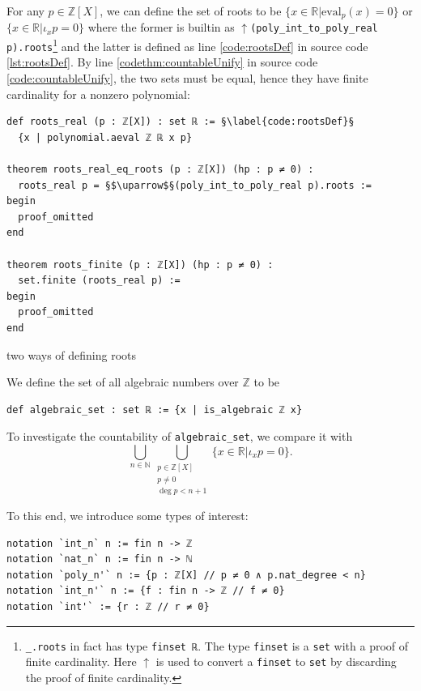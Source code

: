 \documentclass{report}
\theoremstyle{definition}
\newenvironment{code}{\captionsetup{type=listing}}{}
\begin{document}
For any $p\in\mathbb Z[X]$, we can define the set of roots to be $\{x \in\mathbb R | \mathrm{eval}_p(x) = 0\}$ or $\{x\in\mathbb R| \iota_x p=0\}$ where the former is builtin as {\tt \small $\uparrow$(poly\_int\_to\_poly\_real p).roots}\footnote{{\tt \footnotesize \_.roots} in fact has type {\tt \footnotesize finset ℝ}. The type {\tt \footnotesize finset} is a {\tt \footnotesize set} with a proof of finite cardinality. Here $\uparrow$ is used to convert a {\tt \footnotesize finset} to {\tt \footnotesize set} by discarding the proof of finite cardinality.} and the latter is defined as line \ref{code:rootsDef} in source code \ref{lst:rootsDef}. By line \ref{codethm:countableUnify} in source code \ref{code:countableUnify}, the two sets must be equal, hence they have finite cardinality for a nonzero polynomial:

\begin{code}
\begin{verbatim}
def roots_real (p : ℤ[X]) : set ℝ := §\label{code:rootsDef}§
  {x | polynomial.aeval ℤ ℝ x p}

theorem roots_real_eq_roots (p : ℤ[X]) (hp : p ≠ 0) : 
  roots_real p = §$\uparrow$§(poly_int_to_poly_real p).roots :=
begin
  proof_omitted
end

theorem roots_finite (p : ℤ[X]) (hp : p ≠ 0) : 
  set.finite (roots_real p) :=
begin
  proof_omitted
end
\end{verbatim}
\caption{two ways of defining roots}
\label{lst:rootsDef}
\end{code}

We define the set of all algebraic numbers over $\mathbb Z$ to be
\begin{verbatim}
def algebraic_set : set ℝ := {x | is_algebraic ℤ x}
\end{verbatim}
To investigate the countability of {\tt \small algebraic\_set}, we compare it with
\begin{equation}
  \bigcup_{n\in\mathbb N}\bigcup_{\substack{p\in\mathbb{Z}[X]\\ p\ne 0\\ \deg{p}<n+1}} \{x\in\mathbb{R}|\iota_xp=0\}.
  \label{countability:setEq}
\end{equation}


To this end, we introduce some types of interest:
\begin{verbatim}
notation `int_n` n := fin n -> ℤ
notation `nat_n` n := fin n -> ℕ
notation `poly_n'` n := {p : ℤ[X] // p ≠ 0 ∧ p.nat_degree < n}
notation `int_n'` n := {f : fin n -> ℤ // f ≠ 0}
notation `int'` := {r : ℤ // r ≠ 0}
\end{verbatim}
\end{document}
